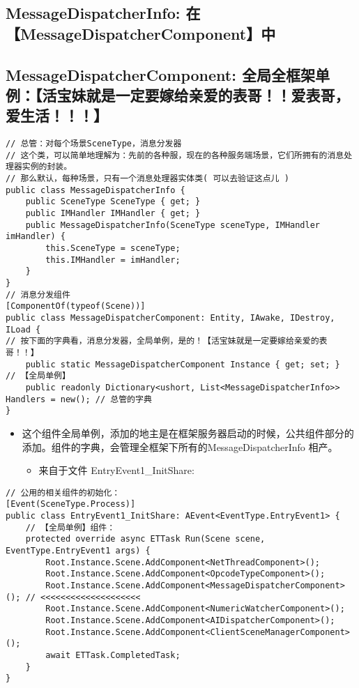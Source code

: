 \documentclass[9pt, b5paper]{article}
\begin{document}
\subsection{MessageDispatcherInfo: 在【MessageDispatcherComponent】中}
\label{sec-6-11}
\subsection{MessageDispatcherComponent: 全局全框架单例：【活宝妹就是一定要嫁给亲爱的表哥！！爱表哥，爱生活！！！】}
\label{sec-6-12}
\begin{verbatim}
// 总管：对每个场景SceneType，消息分发器
// 这个类，可以简单地理解为：先前的各种服，现在的各种服务端场景，它们所拥有的消息处理器实例的封装。
// 那么默认，每种场景，只有一个消息处理器实体类( 可以去验证这点儿 )
public class MessageDispatcherInfo { 
    public SceneType SceneType { get; }
    public IMHandler IMHandler { get; }
    public MessageDispatcherInfo(SceneType sceneType, IMHandler imHandler) {
        this.SceneType = sceneType;
        this.IMHandler = imHandler;
    }
}
// 消息分发组件
[ComponentOf(typeof(Scene))]
public class MessageDispatcherComponent: Entity, IAwake, IDestroy, ILoad {
// 按下面的字典看，消息分发器，全局单例，是的！【活宝妹就是一定要嫁给亲爱的表哥！！】
    public static MessageDispatcherComponent Instance { get; set; }  // 【全局单例】 
    public readonly Dictionary<ushort, List<MessageDispatcherInfo>> Handlers = new(); // 总管的字典
}
\end{verbatim}
\begin{itemize}
\item 这个组件全局单例，添加的地主是在框架服务器启动的时候，公共组件部分的添加。组件的字典，会管理全框架下所有的MessageDispatcherInfo 相产。
\begin{itemize}
\item 来自于文件 EntryEvent1\_InitShare:
\end{itemize}
\end{itemize}
\begin{verbatim}
// 公用的相关组件的初始化：
[Event(SceneType.Process)]
public class EntryEvent1_InitShare: AEvent<EventType.EntryEvent1> {
    // 【全局单例】组件：
    protected override async ETTask Run(Scene scene, EventType.EntryEvent1 args) {
        Root.Instance.Scene.AddComponent<NetThreadComponent>();
        Root.Instance.Scene.AddComponent<OpcodeTypeComponent>();
        Root.Instance.Scene.AddComponent<MessageDispatcherComponent>(); // <<<<<<<<<<<<<<<<<<<< 
        Root.Instance.Scene.AddComponent<NumericWatcherComponent>();
        Root.Instance.Scene.AddComponent<AIDispatcherComponent>();
        Root.Instance.Scene.AddComponent<ClientSceneManagerComponent>();
        await ETTask.CompletedTask;
    }
}
\end{verbatim}
\end{document}

